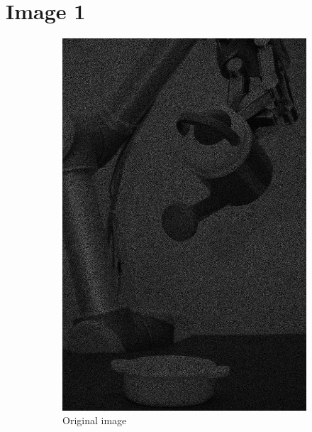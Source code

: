 \chapter{Image 1}
\label{chap:image1}

\begin{figure}[!ht]
	\begin{subfigure}{.49\textwidth}
		\centering
		\includegraphics[width=1\textwidth]{figures/1-imageOriginal}
		\caption{Original image}
		\label{fig:1-ImageOriginalSmall}
	\end{subfigure}
	\begin{subfigure}{.49\textwidth}
		\centering

\end{subfigure}
\end{figure}
